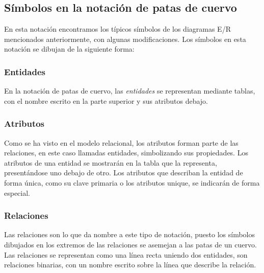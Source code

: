 \subsection{Símbolos en la notación de patas de cuervo}
En esta notación encontramos los típicos símbolos de los diagramas E/R mencionados anteriormente, con algunas modificaciones.
Los símbolos en esta notación se dibujan de la siguiente forma:
\subsubsection{Entidades}
En la notación de patas de cuervo, las \emph{entidades} se representan mediante tablas, con el nombre escrito en la parte superior y sus atributos debajo.

\subsubsection{Atributos}
Como se ha visto en el modelo relacional, los atributos forman parte de las relaciones, en este caso llamadas entidades, simbolizando sus propiedades. Los atributos de una entidad se mostrarán en la tabla que la representa, presentándose uno debajo de otro. Los atributos que describan la entidad de forma única, como su clave primaria o los atributos unique, se indicarán de forma especial.

\subsubsection{Relaciones}
Las relaciones son lo que da nombre a este tipo de notación, puesto los símbolos dibujados en los extremos de las relaciones se asemejan a las patas de un cuervo. Las relaciones se representan como una línea recta uniendo dos entidades, son relaciones binarias, con un nombre escrito sobre la línea que describe la relación.


